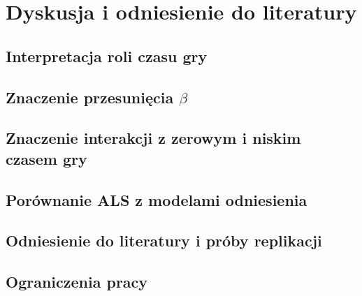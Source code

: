 \chapter{Dyskusja i odniesienie do literatury}
\section{Interpretacja roli czasu gry}
\section{Znaczenie przesunięcia \texorpdfstring{$\beta$}{beta}}
\section{Znaczenie interakcji z zerowym i niskim czasem gry}
\section{Porównanie ALS z modelami odniesienia}
\section{Odniesienie do literatury i próby replikacji}
\section{Ograniczenia pracy}